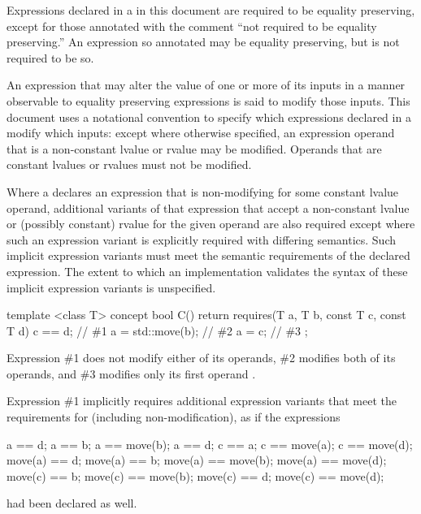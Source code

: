 \pnum
Expressions declared in a  in this document are
required to be equality preserving, except for those annotated with the comment
``not required to be equality preserving.'' An expression so annotated
may be equality preserving, but is not required to be so.

\pnum
An expression that may alter the value of one or more of its inputs in a manner
observable to equality preserving expressions is said to modify those inputs.
This document uses a notational convention to specify which expressions declared
in a  modify which inputs: except where otherwise
specified, an expression operand that is a non-constant lvalue or rvalue may be
modified. Operands that are constant lvalues or rvalues must not be modified.

\pnum
Where a  declares an expression that is non-modifying
for some constant lvalue operand, additional variants of that expression that accept
a non-constant lvalue or (possibly constant) rvalue for the given operand are also
required except where such an expression variant is explicitly required with
differing semantics. Such implicit expression variants must meet the semantic
requirements of the declared expression. The extent to which an implementation
validates the syntax of these implicit expression variants is unspecified.

\enterexample
\begin{codeblock}
template <class T>
concept bool C() {
  return requires(T a, T b, const T c, const T d) {
    c == d;           // \#1
    a = std::move(b); // \#2
    a = c;            // \#3
  };
}
\end{codeblock}

Expression \#1 does not modify either of its operands, \#2 modifies both of its
operands, and \#3 modifies only its first operand .

Expression \#1 implicitly requires additional expression variants that meet the
requirements for  (including non-modification), as if the expressions
\begin{codeblock}
a == d;       a == b;             a == move(b);       a == d;
c == a;       c == move(a);       c == move(d);
move(a) == d; move(a) == b;       move(a) == move(b); move(a) == move(d);
move(c) == b; move(c) == move(b); move(c) == d;       move(c) == move(d);
\end{codeblock}
had been declared as well.

